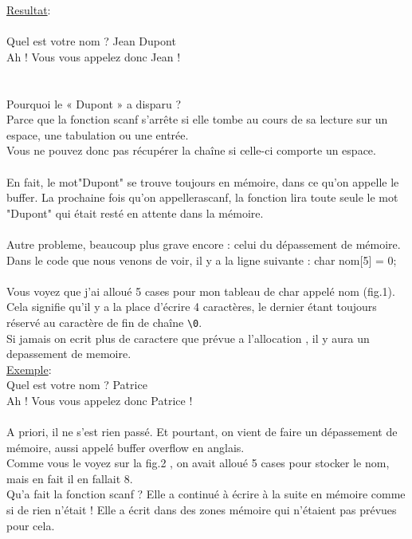 \documentclass[a4paper,12pt,openany]{book}
\begin{document}
{\underline{Resultat}:\\
\\
Quel est votre nom ? Jean Dupont\\
Ah ! Vous vous appelez donc Jean !\\
\\
\\
Pourquoi le « Dupont » a disparu ?\\
Parce que la fonction scanf s'arrête si elle tombe au cours de sa lecture sur un espace, une tabulation ou une entrée.\\
Vous ne pouvez donc pas récupérer la chaîne si celle-ci comporte un espace.\\
\\
En fait, le mot"Dupont" se trouve toujours en mémoire, dans ce qu'on appelle le buffer. La prochaine fois qu'on appellerascanf, la fonction lira toute seule le mot "Dupont" qui était resté en attente dans la mémoire.\\
\\
Autre probleme, beaucoup plus grave encore : celui du dépassement de mémoire.\\
Dans le code que nous venons de voir, il y a la ligne suivante : char nom[5] = {0};\\
\\
Vous voyez que j'ai alloué 5 cases pour mon tableau de char appelé nom (fig.1). Cela signifie qu'il y a la place d'écrire 4 caractères, le dernier étant toujours réservé au caractère de fin de chaîne \verb+\0+.\\

Si jamais on ecrit plus de caractere que prévue a l'allocation , il y aura un depassement de memoire.\\
\underline{Exemple}:\\
Quel est votre nom ? Patrice\\
Ah ! Vous vous appelez donc Patrice !\\
\\
A priori, il ne s'est rien passé. Et pourtant, on vient de faire un dépassement de mémoire, aussi appelé buffer overflow en anglais.\\
Comme vous le voyez sur la fig.2 , on avait alloué 5 cases pour stocker le nom, mais en fait il en fallait 8.\\
Qu'a fait la fonction scanf ? Elle a continué à écrire à la suite en mémoire comme si de rien n'était ! Elle a écrit dans des zones mémoire qui n'étaient pas prévues pour cela.\\

}
\end{document}
